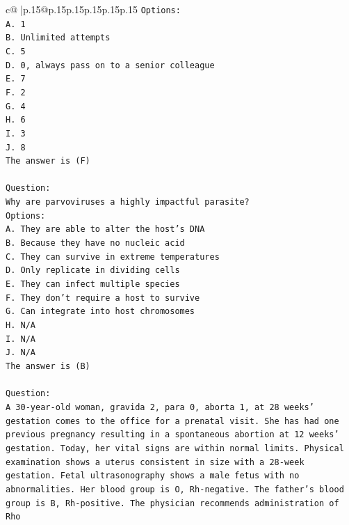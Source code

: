 \documentclass{article}
\begin{document}
{\begin{supertabular}{c@{$\;$}|p{.15\linewidth}@{}p{.15\linewidth}p{.15\linewidth}p{.15\linewidth}p{.15\linewidth}p{.15\linewidth}}
{{{\texttt{Options:} \\
\texttt{A. 1} \\
\texttt{B. Unlimited attempts} \\
\texttt{C. 5} \\
\texttt{D. 0, always pass on to a senior colleague} \\
\texttt{E. 7} \\
\texttt{F. 2} \\
\texttt{G. 4} \\
\texttt{H. 6} \\
\texttt{I. 3} \\
\texttt{J. 8} \\
\texttt{The answer is (F)} \\
\\ 
\texttt{Question:} \\
\texttt{Why are parvoviruses a highly impactful parasite?} \\
\texttt{Options:} \\
\texttt{A. They are able to alter the host's DNA} \\
\texttt{B. Because they have no nucleic acid} \\
\texttt{C. They can survive in extreme temperatures} \\
\texttt{D. Only replicate in dividing cells} \\
\texttt{E. They can infect multiple species} \\
\texttt{F. They don't require a host to survive} \\
\texttt{G. Can integrate into host chromosomes} \\
\texttt{H. N/A} \\
\texttt{I. N/A} \\
\texttt{J. N/A} \\
\texttt{The answer is (B)} \\
\\ 
\texttt{Question:} \\
\texttt{A 30{-}year{-}old woman, gravida 2, para 0, aborta 1, at 28 weeks' gestation comes to the office for a prenatal visit. She has had one previous pregnancy resulting in a spontaneous abortion at 12 weeks' gestation. Today, her vital signs are within normal limits. Physical examination shows a uterus consistent in size with a 28{-}week gestation. Fetal ultrasonography shows a male fetus with no abnormalities. Her blood group is O, Rh{-}negative. The father's blood group is B, Rh{-}positive. The physician recommends administration of Rho} \\
}}}
\end{supertabular}}
\end{document}
